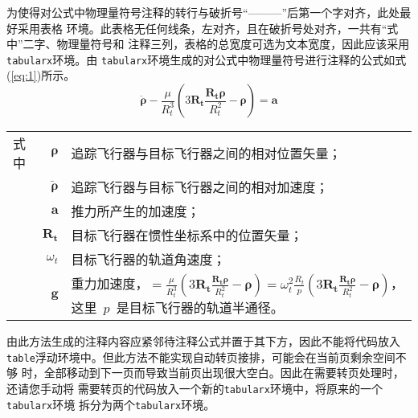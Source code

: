 为使得对公式中物理量符号注释的转行与破折号“———”后第一个字对齐，此处最好采用表格
环境。此表格无任何线条，左对齐，且在破折号处对齐，一共有“式中”二字、物理量符号和
注释三列，表格的总宽度可选为文本宽度，因此应该采用\verb|tabularx|环境。由
\verb|tabularx|环境生成的对公式中物理量符号进行注释的公式如式(\ref{eq:1})所示。
\begin{equation}\label{eq:1}
	\ddot{\boldsymbol{\rho}}-\frac{\mu}{R_{t}^{3}}\left(3\mathbf{R_{t}}\frac{\mathbf{R_{t}\rho}}{R_{t}^{2}}-\boldsymbol{\rho}\right)=\mathbf{a}
\end{equation}
\begin{tabularx}{\textwidth}{@{}l@{\quad}r@{———}X@{}}
	式中 & $\boldsymbol{\rho}$        & 追踪飞行器与目标飞行器之间的相对位置矢量；                                                                                                                                                                                                                                  \\
	     & $\boldsymbol{\ddot{\rho}}$ & 追踪飞行器与目标飞行器之间的相对加速度；                                                                                                                                                                                                                                    \\
	     & $\mathbf{a}$               & 推力所产生的加速度；                                                                                                                                                                                                                                                        \\
	     & $\mathbf{R_t}$             & 目标飞行器在惯性坐标系中的位置矢量；                                                                                                                                                                                                                                        \\
	     & $\omega_{t}$               & 目标飞行器的轨道角速度；                                                                                                                                                                                                                                                    \\
	     & $\mathbf{g}$               & 重力加速度，$=\frac{\mu}{R_{t}^{3}}\left(3\mathbf{R_{t}}\frac{\mathbf{R_{t}\rho}}{R_{t}^{2}}-\boldsymbol{\rho}\right)=\omega_{t}^{2}\frac{R_{t}}{p}\left(3\mathbf{R_{t}}\frac{\mathbf{R_{t}\rho}}{R_{t}^{2}}-\boldsymbol{\rho}\right)$，这里~$p$~是目标飞行器的轨道半通径。
\end{tabularx}\vspace{3.15bp}
由此方法生成的注释内容应紧邻待注释公式并置于其下方，因此不能将代码放入
\verb|table|浮动环境中。但此方法不能实现自动转页接排，可能会在当前页剩余空间不够
时，全部移动到下一页而导致当前页出现很大空白。因此在需要转页处理时，还请您手动将
需要转页的代码放入一个新的\verb|tabularx|环境中，将原来的一个\verb|tabularx|环境
拆分为两个\verb|tabularx|环境。

